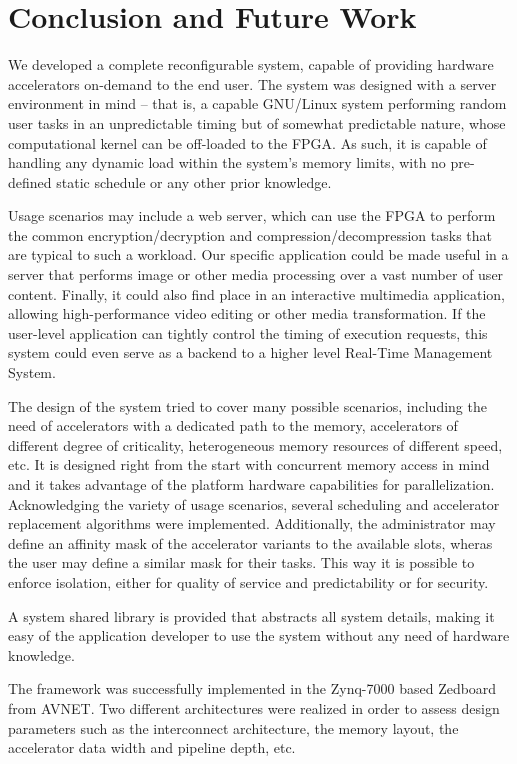 \chapter{Conclusion and Future Work}

We developed a complete reconfigurable system, capable of providing hardware accelerators on-demand to the end user.
The system was designed with a server environment in mind -- that is, a capable GNU/Linux system performing
random user tasks in an unpredictable timing but of somewhat predictable nature, whose computational kernel
can be off-loaded to the FPGA. As such, it is capable of handling any dynamic load within the system's memory limits,
with no pre-defined static schedule or any other prior knowledge.

Usage scenarios may include a web server, which can use the FPGA to perform the common encryption/decryption and
compression/decompression tasks that are typical to such a workload. Our specific application could be made useful
in a server that performs image or other media processing over a vast number of user content. Finally, it could
also find place in an interactive multimedia application,
allowing high-performance video editing or other media transformation.
If the user-level application can tightly control the timing of execution requests, this system could even serve
as a backend to a higher level Real-Time Management System.

The design of the system tried to cover many possible scenarios, including the need of accelerators with
a dedicated path to the memory, accelerators of different degree of criticality,
heterogeneous memory resources of different speed, etc.
It is designed right from the start with concurrent memory access in mind and it takes advantage of the
platform hardware capabilities for parallelization. Acknowledging the variety of usage scenarios, several
scheduling and accelerator replacement algorithms were implemented.
Additionally, the administrator may define an affinity mask of the accelerator variants to the available slots,
wheras the user may define a similar mask for their tasks. This way it is possible to enforce isolation,
either for quality of service and predictability or for security.

A system shared library is provided that abstracts all system details, making it easy of the application
developer to use the system without any need of hardware knowledge.

The framework was successfully implemented in the Zynq-7000 based Zedboard from AVNET.
Two different architectures were realized in order to assess design parameters such as the
interconnect architecture, the memory layout, the accelerator data width and pipeline depth, etc.

